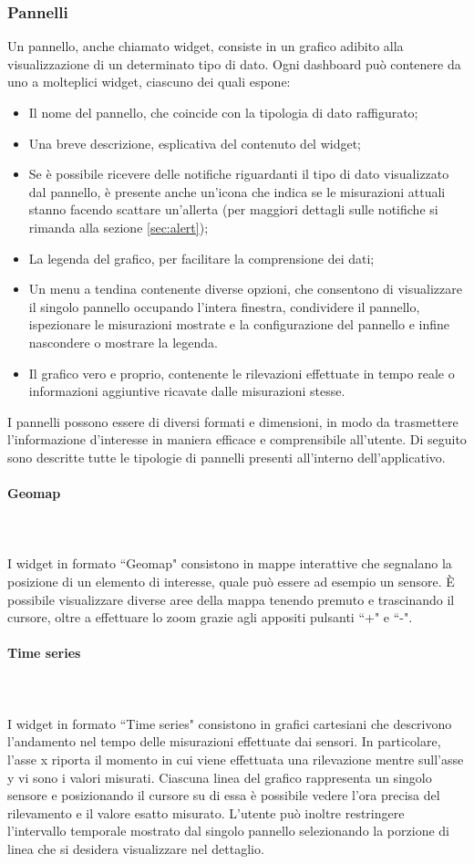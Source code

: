 \documentclass[8pt]{article}
\newcommand{\subsubsubsection}[1]{\paragraph{#1}\mbox{}\\\\}
\begin{document}
\subsubsection{Pannelli}
Un pannello, anche chiamato widget, consiste in un grafico adibito alla visualizzazione di un determinato tipo di dato. Ogni dashboard può contenere da uno a molteplici widget, ciascuno dei quali espone:
\begin{itemize}
\setlength\itemsep{0em}
    \item Il nome del pannello, che coincide con la tipologia di dato raffigurato;
    \item Una breve descrizione, esplicativa del contenuto del widget;
    \item Se è possibile ricevere delle notifiche riguardanti il tipo di dato visualizzato dal pannello, è presente anche un'icona che indica se le misurazioni attuali stanno facendo scattare un'allerta (per maggiori dettagli sulle notifiche si rimanda alla sezione \ref{sec:alert});
    \item La legenda del grafico, per facilitare la comprensione dei dati;
    \item Un menu a tendina contenente diverse opzioni, che consentono di visualizzare il singolo pannello occupando l'intera finestra, condividere il pannello, ispezionare le misurazioni mostrate e la configurazione del pannello e infine nascondere o mostrare la legenda.
    \item Il grafico vero e proprio, contenente le rilevazioni effettuate in tempo reale o informazioni aggiuntive ricavate dalle misurazioni stesse.
\end{itemize}
I pannelli possono essere di diversi formati e dimensioni, in modo da trasmettere l'informazione d'interesse in maniera efficace e comprensibile all'utente. Di seguito sono descritte tutte le tipologie di pannelli presenti all'interno dell'applicativo.

\subsubsubsection{Geomap}
I widget in formato ``Geomap" consistono in mappe interattive che segnalano la posizione di un elemento di interesse, quale può essere ad esempio un sensore. È possibile visualizzare diverse aree della mappa tenendo premuto e trascinando il cursore, oltre a effettuare lo zoom grazie agli appositi pulsanti ``+" e ``-". 
\subsubsubsection{Time series}
I widget in formato ``Time series" consistono in grafici cartesiani che descrivono l'andamento nel tempo delle misurazioni effettuate dai sensori. In particolare, l'asse x riporta il momento in cui viene effettuata una rilevazione mentre sull'asse y vi sono i valori misurati. Ciascuna linea del grafico rappresenta un singolo sensore e posizionando il cursore su di essa è possibile vedere l'ora precisa del rilevamento e il valore esatto misurato. L'utente può inoltre restringere l'intervallo temporale mostrato dal singolo pannello selezionando la porzione di linea che si desidera visualizzare nel dettaglio.
\end{document}
